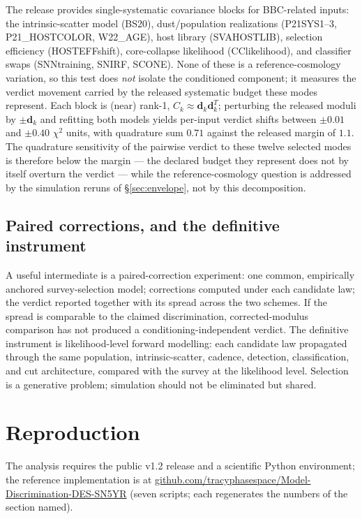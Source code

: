 \documentclass[11pt]{article}
\begin{document}
The release provides single-systematic covariance blocks for BBC-related
inputs: the intrinsic-scatter model (BS20), dust/population realizations
(P21SYS1--3, P21\_HOSTCOLOR, W22\_AGE), host library (SVAHOSTLIB),
selection efficiency (HOSTEFFshift), core-collapse likelihood
(CClikelihood), and classifier swaps (SNNtraining, SNIRF, SCONE). None of
these is a reference-cosmology variation, so this test does \emph{not}
isolate the conditioned component; it measures the verdict movement
carried by the released systematic budget these modes represent. Each
block is (near) rank-1, $C_k \approx \boldsymbol{d}_k
\boldsymbol{d}_k^{T}$; perturbing the released moduli by
$\pm\boldsymbol{d}_k$ and refitting both models yields per-input verdict
shifts between $\pm 0.01$ and $\pm 0.40$ $\chi^2$ units, with quadrature
sum $0.71$ against the released margin of $1.1$. The quadrature
sensitivity of the pairwise verdict to these twelve selected modes is
therefore below the margin --- the declared budget they represent does not
by itself overturn the verdict --- while the reference-cosmology question
is addressed by the simulation reruns of \S\ref{sec:envelope}, not by
this decomposition.

\subsection{Paired corrections, and the definitive instrument}

A useful intermediate is a paired-correction experiment: one common,
empirically anchored survey-selection model; corrections computed under
each candidate law; the verdict reported together with its spread across
the two schemes. If the spread is comparable to the claimed
discrimination, corrected-modulus comparison has not produced a
conditioning-independent verdict. The definitive instrument is
likelihood-level forward modelling: each candidate law propagated through
the same population, intrinsic-scatter, cadence, detection,
classification, and cut architecture, compared with the survey at the
likelihood level. Selection is a generative problem; simulation should
not be eliminated but shared.

\section{Reproduction}
\label{sec:repro}

The analysis requires the public v1.2 release and a scientific Python
environment; the reference implementation is at
\href{https://github.com/tracyphasespace/Model-Discrimination-DES-SN5YR}{github.com/tracyphasespace/Model-Discrimination-DES-SN5YR}
(seven scripts; each regenerates the numbers of the section named).
\end{document}
